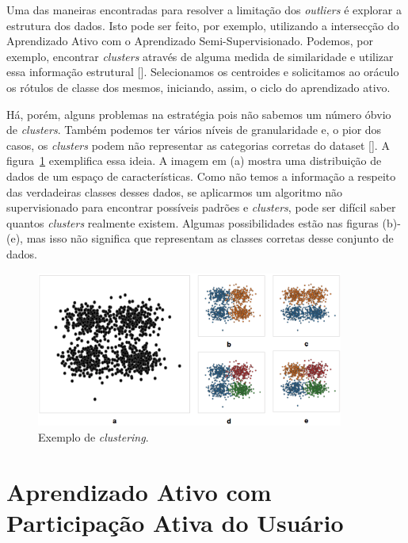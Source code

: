 Uma das maneiras encontradas para resolver a limitação dos \emph{outliers} é explorar a estrutura dos dados. Isto pode ser feito, por exemplo, utilizando a intersecção do Aprendizado Ativo com o Aprendizado Semi-Supervisionado. Podemos, por exemplo, encontrar \emph{clusters} através de alguma medida de similaridade e utilizar essa informação estrutural [\cite{saito2014active, dasgupta2011two}]. Selecionamos os centroides e solicitamos ao oráculo os rótulos de classe dos mesmos, iniciando, assim, o ciclo do aprendizado ativo. 

Há, porém, alguns problemas na estratégia pois não sabemos um número óbvio de \emph{clusters}. Também podemos ter vários níveis de granularidade e, o pior dos casos, os \emph{clusters} podem não representar as categorias corretas do dataset [\cite{dasgupta2011two, settles2014active}].  A figura~\ref{fig:toy_example_clustering} exemplifica essa ideia. A imagem em (a) mostra uma distribuição de dados de um espaço de características. Como não temos a informação a respeito das verdadeiras classes desses dados, se aplicarmos um algoritmo não supervisionado para encontrar possíveis padrões e \emph{clusters}, pode ser difícil saber quantos \emph{clusters} realmente existem. Algumas possibilidades estão nas figuras (b)-(e), mas isso não significa que representam as classes corretas desse conjunto de dados. 


\begin{figure}
  \centering
  \includegraphics[width=0.9\textwidth]{figures/toy_example_clustering.png}
  \caption{Exemplo de \emph{clustering}.}
  \label{fig:toy_example_clustering}
\end{figure}


\section{Aprendizado Ativo com Participação Ativa do Usuário}
\label{sec:aprendizado_ativo_variacoes}

